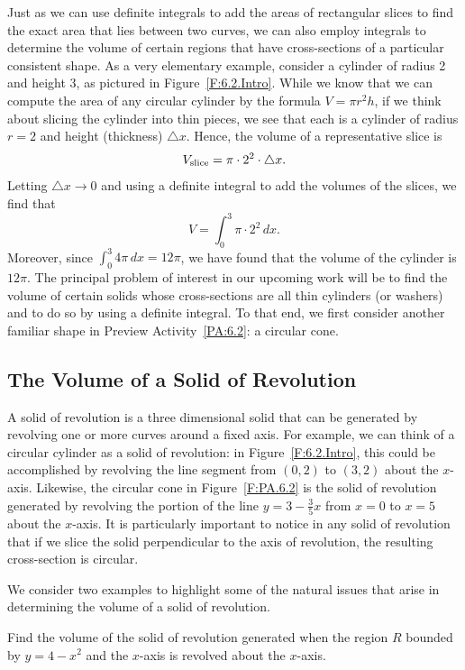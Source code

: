 Just as we can use definite integrals to add the areas of rectangular slices to find the exact area that lies between two curves, we can also employ integrals to determine the volume of certain regions that have cross-sections of a particular consistent shape.  As a very elementary example, consider a cylinder of radius 2 and height 3, as pictured in Figure~\ref{F:6.2.Intro}.  While we know that we can compute the area of any circular cylinder by the formula $V = \pi r^2 h$, if we think about slicing the cylinder into thin pieces, we see that each is a cylinder of radius $r = 2$ and height (thickness) $\triangle x$.  Hence, the volume of a representative slice is
$$V_{\small{\text{slice}}} = \pi \cdot 2^2 \cdot \triangle x.$$
Letting $\triangle x \to 0$ and using a definite integral to add the volumes of the slices, we find that 
$$V = \int_0^3 \pi \cdot 2^2 \, dx.$$
Moreover, since $\int_0^3 4\pi \, dx = 12\pi$, we have found that the volume of the cylinder is $12\pi$.  The principal problem of interest in our upcoming work will be to find the volume of certain solids whose cross-sections are all thin cylinders (or washers) and to do so by using a definite integral.  To that end, we first consider another familiar shape in Preview Activity~\ref{PA:6.2}: a circular cone.



\subsection*{The Volume of a Solid of Revolution} 

A solid of revolution is a three dimensional solid that can be generated by revolving one or more curves around a fixed axis.  For example, we can think of a circular cylinder as a solid of revolution:  in Figure~\ref{F:6.2.Intro}, this could be accomplished by revolving the line segment from $(0,2)$ to $(3,2)$ about the $x$-axis.  Likewise, the circular cone in Figure~\ref{F:PA.6.2} is the solid of revolution generated by revolving the portion of the line $y = 3 - \frac{3}{5}x$ from $x = 0$ to $x = 5$ about the $x$-axis.  It is particularly important to notice in any solid of revolution that if we slice the solid perpendicular to the axis of revolution, the resulting cross-section is circular.

We consider two examples to highlight some of the natural issues that arise in determining the volume of a solid of revolution.

\bex \label{Ex:6.2.Disks}
Find the volume of the solid of revolution generated when the region $R$ bounded by $y = 4-x^2$ and the $x$-axis is revolved about the $x$-axis.
\eex

